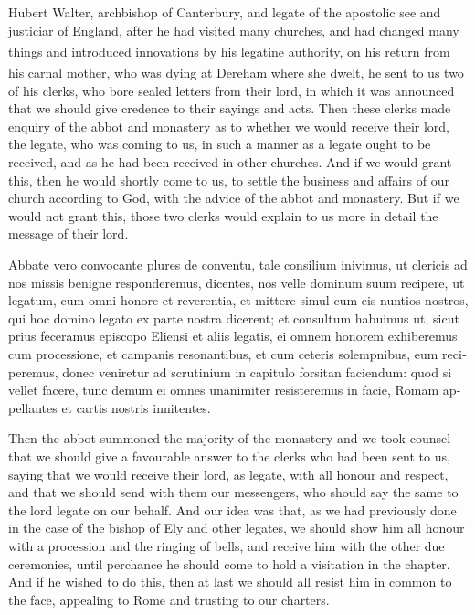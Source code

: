 \documentclass[10pt]{book}
\newcounter{engnote}
\newcommand{\engnotenum}{\textsuperscript{\arabic{engnote}\stepcounter{engnote}}}
\begin{document}
\begin{paracol}{2}
Hubert Walter, archbishop of Canterbury, and legate of the apostolic see and justiciar of England, after he had visited many churches, and had changed many things and introduced innovations by his legatine authority,\engnotenum{} on his return from his carnal mother, who was dying at Dereham\engnotenum{} where she dwelt, he sent to us two of his clerks, who bore sealed letters from their lord, in which it was announced that we should give credence to their sayings and acts. Then these clerks made enquiry of the abbot and monastery as to whether we would receive their lord, the legate, who was coming to us, in such a manner as a legate ought to be received, and as he had been received in other churches. And if we would grant this, then he would shortly come to us, to settle the business and affairs of our church according to God, with the advice of the abbot and monastery. But if we would not grant this, those two clerks would explain to us more in detail the message of their lord.

\switchcolumn*

\begin{otherlanguage}{latin}
Abbate vero convocante plures de conventu, tale consilium inivimus, ut clericis ad nos missis benigne responderemus, dicentes, nos velle dominum suum recipere, ut legatum, cum omni honore et reverentia, et mittere simul cum eis nuntios nostros, qui hoc domino legato ex parte nostra dicerent; et consultum habuimus ut, sicut prius feceramus episcopo Eliensi et aliis legatis, ei omnem honorem exhiberemus cum processione, et campanis resonantibus, et cum ceteris solempnibus, eum reciperemus, donec veniretur ad scrutinium in capitulo forsitan faciendum: quod si vellet facere, tunc demum ei omnes unanimiter resisteremus in facie, Romam appellantes et cartis nostris innitentes. 

\end{otherlanguage}

\switchcolumn

Then the abbot summoned the majority of the monastery and we took counsel that we should give a favourable answer to the clerks who had been sent to us, saying that we would receive their lord, as legate, with all honour and respect, and that we should send with them our messengers, who should say the same to the lord legate on our behalf. And our idea was that, as we had previously done in the case of the bishop of Ely and other legates, we should show him all honour with a procession and the ringing of bells, and receive him with the other due ceremonies, until perchance he should come to hold a visitation in the chapter. And if he wished to do this, then at last we should all resist him in common to the face, appealing to Rome and trusting to our charters.


\end{paracol}
\end{document}
